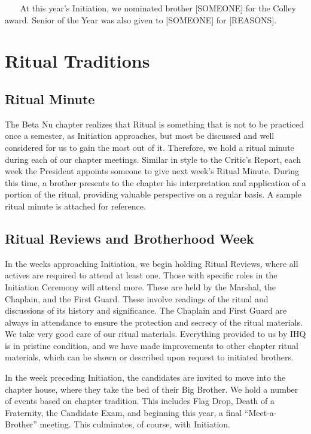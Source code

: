     At this year's Initiation, we nominated brother [SOMEONE] for the Colley award. Senior of the Year was also given to [SOMEONE] for [REASONS]. 
    
  \section*{Ritual Traditions}
    \subsection*{Ritual Minute}
      The Beta Nu chapter realizes that Ritual is something that is not to be practiced once a semester, as Initiation approaches, but most be discussed and well considered for us to gain the most out of it. Therefore, we hold a ritual minute during each of our chapter meetings. Similar in style to the Critic's Report, each week the President appoints someone to give next week's Ritual Minute. During this time, a brother presents to the chapter his interpretation and application of a portion of the ritual, providing valuable perspective on a regular basis. A sample ritual minute is attached for reference. \\
    
    \subsection*{Ritual Reviews and Brotherhood Week}
      In the weeks approaching Initiation, we begin holding Ritual Reviews, where all actives are required to attend at least one. Those with specific roles in the Initiation Ceremony will attend more. These are held by the Marshal, the Chaplain, and the First Guard. These involve readings of the ritual and discussions of its history and significance. The Chaplain and First Guard are always in attendance to ensure the protection and secrecy of the ritual materials. We take very good care of our ritual materials. Everything provided to us by IHQ is in pristine condition, and we have made improvements to other chapter ritual materials, which can be shown or described upon request to initiated brothers.
      
      In the week preceding Initiation, the candidates are invited to move into the chapter house, where they take the bed of their Big Brother. We hold a number of events based on chapter tradition. This includes Flag Drop, Death of a Fraternity, the Candidate Exam, and beginning this year, a final ``Meet-a-Brother'' meeting. This culminates, of course, with Initiation.
      
